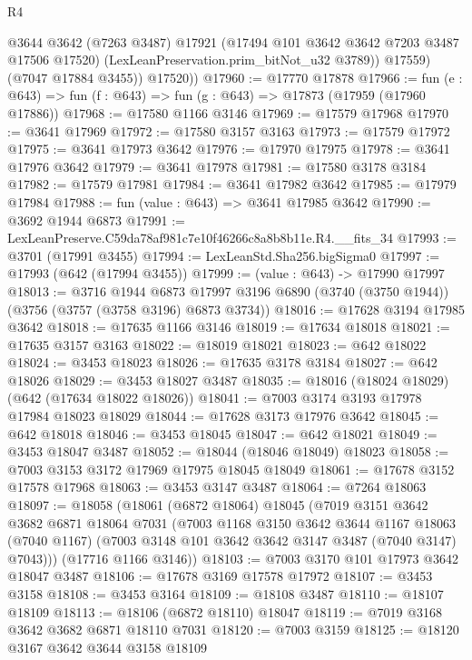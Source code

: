\begin{lexlean}{R4}
\begin{coremodule}
              @3644
              @3642
              (@7263 @3487)
              @17921
              (@17494 @101 @3642 @3642 @7203 @3487 @17506 @17520)
              (LexLeanPreservation.prim_bitNot_u32 @3789))
            @17559)
          (@7047 @17884 @3455))
        @17520))
@17960 := @17770 @17878
@17966 := fun (e : @643) => fun (f : @643) => fun (g : @643) => @17873 (@17959 (@17960 @17886))
@17968 := @17580 @1166 @3146
@17969 := @17579 @17968
@17970 := @3641 @17969
@17972 := @17580 @3157 @3163
@17973 := @17579 @17972
@17975 := @3641 @17973 @3642
@17976 := @17970 @17975
@17978 := @3641 @17976 @3642
@17979 := @3641 @17978
@17981 := @17580 @3178 @3184
@17982 := @17579 @17981
@17984 := @3641 @17982 @3642
@17985 := @17979 @17984
@17988 := fun (value : @643) => @3641 @17985 @3642
@17990 := @3692 @1944 @6873
@17991 := LexLeanPreserve.C59da78af981c7e10f46266c8a8b8b11e.R4.__fits_34
@17993 := @3701 (@17991 @3455)
@17994 := LexLeanStd.Sha256.bigSigma0
@17997 := @17993 (@642 (@17994 @3455))
@17999 := (value : @643) -> @17990 @17997
@18013 := @3716
    @1944
    @6873
    @17997
    @3196
    @6890
    (@3740 (@3750 @1944))
    (@3756 (@3757 (@3758 @3196) @6873 @3734))
@18016 := @17628 @3194 @17985 @3642
@18018 := @17635 @1166 @3146
@18019 := @17634 @18018
@18021 := @17635 @3157 @3163
@18022 := @18019 @18021
@18023 := @642 @18022
@18024 := @3453 @18023
@18026 := @17635 @3178 @3184
@18027 := @642 @18026
@18029 := @3453 @18027 @3487
@18035 := @18016 (@18024 @18029) (@642 (@17634 @18022 @18026))
@18041 := @7003 @3174 @3193 @17978 @17984 @18023 @18029
@18044 := @17628 @3173 @17976 @3642
@18045 := @642 @18018
@18046 := @3453 @18045
@18047 := @642 @18021
@18049 := @3453 @18047 @3487
@18052 := @18044 (@18046 @18049) @18023
@18058 := @7003 @3153 @3172 @17969 @17975 @18045 @18049
@18061 := @17678 @3152 @17578 @17968
@18063 := @3453 @3147 @3487
@18064 := @7264 @18063
@18097 := @18058
    (@18061
      (@6872 @18064)
      @18045
      (@7019
        @3151
        @3642
        @3682
        @6871
        @18064
        @7031
        (@7003
          @1168
          @3150
          @3642
          @3644
          @1167
          @18063
          (@7040 @1167)
          (@7003 @3148 @101 @3642 @3642 @3147 @3487 (@7040 @3147) @7043)))
      (@17716 @1166 @3146))
@18103 := @7003 @3170 @101 @17973 @3642 @18047 @3487
@18106 := @17678 @3169 @17578 @17972
@18107 := @3453 @3158
@18108 := @3453 @3164
@18109 := @18108 @3487
@18110 := @18107 @18109
@18113 := @18106 (@6872 @18110) @18047
@18119 := @7019 @3168 @3642 @3682 @6871 @18110 @7031
@18120 := @7003 @3159
@18125 := @18120 @3167 @3642 @3644 @3158 @18109

\end{coremodule}
\end{lexlean}
